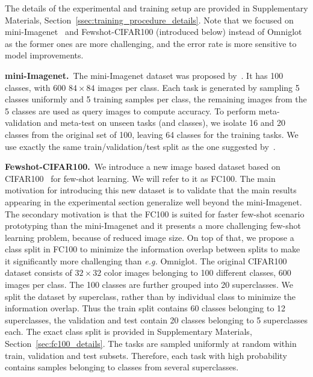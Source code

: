 \documentclass{article}
\begin{document}
The details of the experimental and training setup are provided in Supplementary Materials, Section~\ref{ssec:training_procedure_details}. Note that we focused on mini-Imagenet~\cite{vinyals2016matching} and Fewshot-CIFAR100 (introduced below) instead of Omniglot \cite{lake2015human,vinyals2016matching, snell2017prototypical} as the former ones are more challenging, and the error rate is more sensitive to model improvements.

\textbf{mini-Imagenet.}~The mini-Imagenet dataset was proposed by~\citet{vinyals2016matching}. It has 100 classes, with 600 $84 \times 84$ images per class. Each task is generated by sampling 5 classes uniformly and 5 training samples per class, the remaining images from the 5 classes are used as query images to compute accuracy. To perform meta-validation and meta-test on unseen tasks (and classes), we isolate 16 and 20 classes from the original set of 100, leaving 64 classes for the training tasks. We use exactly the same train/validation/test split as the one suggested by~\citet{ravi2016optimization}. 

\textbf{Fewshot-CIFAR100.}~We introduce a new image based dataset based on CIFAR100~\citep{Krizhevsky2009learning} for few-shot learning. We will refer to it as FC100. The main motivation for introducing this new dataset is to validate that the main results appearing in the experimental section generalize well beyond the mini-Imagenet. The secondary motivation is that the FC100 is suited for faster few-shot scenario prototyping than the mini-Imagenet and it presents a more challenging few-shot learning problem, because of reduced image size. On top of that, we propose a class split in FC100 to minimize the information overlap between splits to make it significantly more challenging than \emph{e.g.} Omniglot. The original CIFAR100 dataset consists of $32 \times 32$ color images belonging to 100 different classes, 600 images per class. The 100 classes are further grouped into 20 superclasses. We split the dataset by superclass, rather than by individual class to minimize the information overlap. Thus the train split contains 60 classes belonging to 12 superclasses, the validation and test contain 20 classes belonging to 5 superclasses each. The exact class split is provided in Supplementary Materials, Section~\ref{sec:fc100_details}. The tasks are sampled uniformly at random within train, validation and test subsets. Therefore, each task with high probability contains samples belonging to classes from several superclasses.
\end{document}
